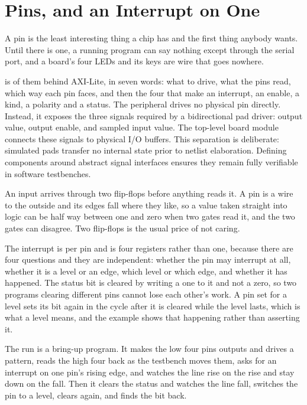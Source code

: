 \section{Pins, and an Interrupt on One}
\label{sec:x-gpio}

A pin is the least interesting thing a chip has and the first thing
anybody wants. Until there is one, a running program can say nothing
except through the serial port, and a board's four LEDs and its keys
are wire that goes nowhere.

 is  of them behind AXI-Lite, in seven words: what
to drive, what the pins read, which way each pin faces, and then the
four that make an interrupt, an enable, a kind, a polarity and a
status. The peripheral drives no physical pin directly. Instead, it exposes
the three signals required by a bidirectional pad driver: output value,
output enable, and sampled input value. The top-level board module
connects these signals to physical I/O buffers. This separation is
deliberate: simulated pads transfer no internal state prior to netlist
elaboration. Defining components around abstract signal interfaces ensures
they remain fully verifiable in software testbenches.

An input arrives through two flip-flops before anything reads it.
A pin is a wire to the outside and its edges fall where they like, so
a value taken straight into logic can be half way between one and zero
when two gates read it, and the two gates can disagree. Two flip-flops
is the usual price of not caring.

The interrupt is per pin and is four registers rather than one,
because there are four questions and they are independent: whether the
pin may interrupt at all, whether it is a level or an edge, which
level or which edge, and whether it has happened. The status bit is
cleared by writing a one to it and not a zero, so two programs
clearing different pins cannot lose each other's work. A pin set for a
level sets its bit again in the cycle after it is cleared while the
level lasts, which is what a level means, and the example shows that
happening rather than asserting it.

The run is a bring-up program. It makes the low four pins outputs and
drives a pattern, reads the high four back as the testbench moves
them, asks for an interrupt on one pin's rising edge, and watches the
line rise on the rise and stay down on the fall. Then it clears the
status and watches the line fall, switches the pin to a level, clears
again, and finds the bit back.

